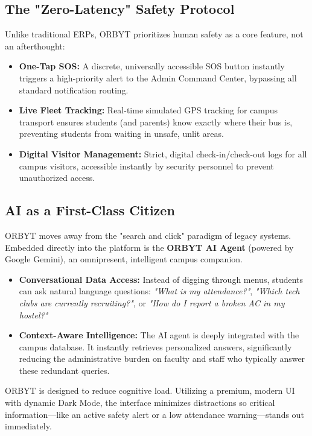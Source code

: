 \documentclass[11pt,a4paper]{article}
\begin{document}
\subsection{The "Zero-Latency" Safety Protocol}
Unlike traditional ERPs, ORBYT prioritizes human safety as a core feature, not an afterthought:
\begin{itemize}
    \item \textbf{One-Tap SOS:} A discrete, universally accessible SOS button instantly triggers a high-priority alert to the Admin Command Center, bypassing all standard notification routing.
    \item \textbf{Live Fleet Tracking:} Real-time simulated GPS tracking for campus transport ensures students (and parents) know exactly where their bus is, preventing students from waiting in unsafe, unlit areas.
    \item \textbf{Digital Visitor Management:} Strict, digital check-in/check-out logs for all campus visitors, accessible instantly by security personnel to prevent unauthorized access.
\end{itemize}

\subsection{AI as a First-Class Citizen}
ORBYT moves away from the "search and click" paradigm of legacy systems. Embedded directly into the platform is the \textbf{ORBYT AI Agent} (powered by Google Gemini), an omnipresent, intelligent campus companion.
\begin{itemize}
    \item \textbf{Conversational Data Access:} Instead of digging through menus, students can ask natural language questions: \textit{"What is my attendance?"}, \textit{"Which tech clubs are currently recruiting?"}, or \textit{"How do I report a broken AC in my hostel?"}
    \item \textbf{Context-Aware Intelligence:} The AI agent is deeply integrated with the campus database. It instantly retrieves personalized answers, significantly reducing the administrative burden on faculty and staff who typically answer these redundant queries.
\end{itemize}

\begin{alertbox}
ORBYT is designed to reduce cognitive load. Utilizing a premium, modern UI with dynamic Dark Mode, the interface minimizes distractions so critical information—like an active safety alert or a low attendance warning—stands out immediately.
\end{alertbox}
\end{document}
